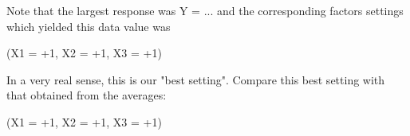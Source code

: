 Note that the largest response was Y = ... and the corresponding
factors settings which yielded this data value was

   (X1 = +1, X2 = +1, X3 = +1)

In a very real sense, this is our "best setting".  Compare this
best setting with that obtained from the averages:

   (X1 = +1, X2 = +1, X3 = +1)


